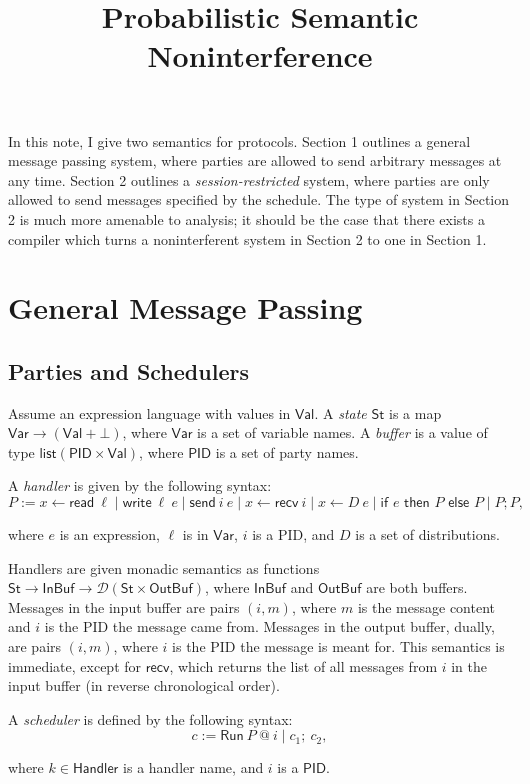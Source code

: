 \documentclass{article}
\title {Probabilistic Semantic Noninterference}
\newcommand{\Val}{\mathsf{Val}}
\newcommand{\St}{\mathsf{St}}
\newcommand{\InBuf}{\mathsf{InBuf}}
\newcommand{\OutBuf}{\mathsf{OutBuf}}
\newcommand{\PID}{\mathsf{PID}}
\newcommand{\Var}{\mathsf{Var}}
\newcommand{\Handler}{\mathsf{Handler}}
\newcommand{\List}{\mathsf{list}}
\newcommand{\D}{\mathcal{D}}
\newcommand{\Read}{\mathsf{read}}
\newcommand{\Write}{\mathsf{write}}
\newcommand{\send}{\mathsf{send}}
\newcommand{\recv}{\mathsf{recv}}
\begin{document}
\maketitle

In this note, I give two semantics for protocols. Section 1 outlines a general message passing system, where parties are allowed to send arbitrary messages at any time. Section 2 outlines a \emph{session-restricted} system, where parties are only allowed to send messages specified by the schedule. 
The type of system in Section 2 is much more amenable to analysis; it should be the case that there exists a compiler which turns a noninterferent system in Section 2 to one in Section 1.

\section{General Message Passing}
\subsection{Parties and Schedulers}

Assume an expression language with values in $\Val$. A \emph{state} $\St$ is a map $\Var \to (\Val + \bot)$, where $\Var$ is a set of variable names. A \emph{buffer} is a value of type $\List (\PID \times \Val)$, where $\PID$ is a set of party names.

A \emph{handler} is given by the following syntax:
\[ P := x \leftarrow \Read\ \ell \mid \Write\ \ell\ e \mid \send\ i\ e \mid x \leftarrow \recv\ i \mid x \leftarrow D\ e \mid \textsf{if } e \textsf{ then } P \textsf{ else } P \mid P; P, \]

where $e$ is an expression, $\ell$ is in $\Var$, $i$ is a PID, and $D$ is a set of distributions.

Handlers are given monadic semantics as functions $\St \to \InBuf \to \D(\St \times \OutBuf)$, where $\InBuf$ and $\OutBuf$ are both buffers. Messages in the input buffer are pairs $(i,m)$, where $m$ is the message content and $i$ is the PID the message came from. Messages in the output buffer, dually, are pairs $(i,m)$, where $i$ is the PID the message is meant for. This semantics is immediate, except for $\recv$, which returns the list of all messages from $i$ in the input buffer (in reverse chronological order).

A \emph{scheduler} is defined by the following syntax:
\[ c := \textsf{Run}\ P\ @\ i \mid c_1;\ c_2, \]

where $k \in \Handler$ is a handler name, and $i$ is a $\PID$.
\end{document}

